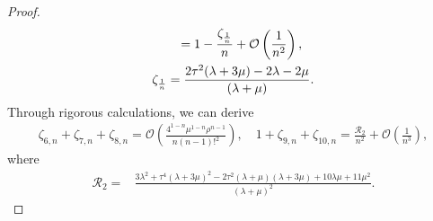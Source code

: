 \documentclass[10pt,a4paper]{amsart}
\begin{document}
\begin{proof}
\begin{align}
		&\quad\quad=1-\frac{\zeta_{\frac{1}{n}}}{n}+\mathcal{O}\left(\frac{1}{n^2}\right),\notag\\
		&\zeta_{\frac{1}{n}}=\frac{2\tau ^2 (\lambda +3 \mu )-2\lambda -2\mu}{(\lambda +\mu )}.\notag
	\end{align}
	Through rigorous calculations, we can derive	
	\begin{align}\label{eq:zeta2}
		\zeta _{6,n}+\zeta _{7,n}+\zeta _{8,n}=\mathcal{O}\left(\frac{4^{1-n} \mu ^{1-n} \rho ^{n-1}}{n  (n-1)!^2}\right),\quad
		1+\zeta _{9,n}+\zeta _{10,n}=\frac{\mathcal{R}_{2}}{n^2}+\mathcal{O}\left(\frac{1}{n^3}\right),
	\end{align}
	where
	\begin{align}\label{eq:R2}
		\mathcal{R}_{2}=&\frac{3 \lambda ^2+\tau ^4 (\lambda +3 \mu )^2-2 \tau ^2 (\lambda +\mu ) (\lambda +3 \mu )+10 \lambda  \mu +11 \mu ^2}{(\lambda +\mu )^2}.
	\end{align}
	

\end{proof}
\end{document}
